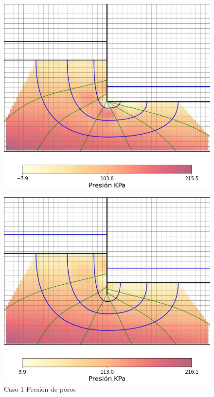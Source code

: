\begin{figure}[H]
    \centering
    \begin{minipage}{0.32\textwidth}
        \centering
        \includegraphics[width=\textwidth]{GRAFICOS/caso_1_presion_poros.jpg}
        \caption{Caso 1 Presión de poros}
        \label{fig:caso_1_presion_poros}
    \end{minipage}
    \begin{minipage}{0.32\textwidth}
        \centering
        \includegraphics[width=\textwidth]{GRAFICOS/caso_2_presion_poros.jpg}

\end{minipage}
\end{figure}
